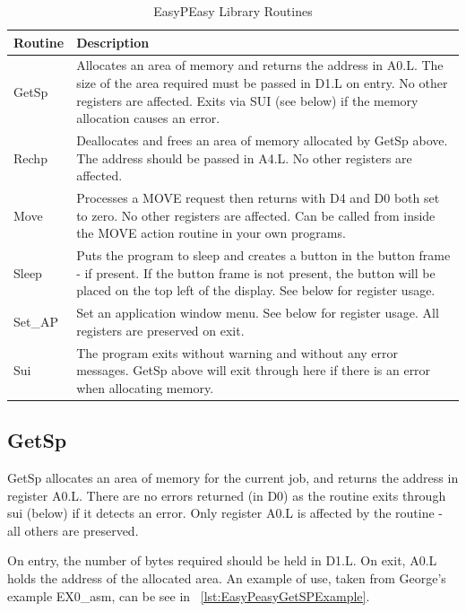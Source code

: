 \begin{table}[htbp]
\centering
\begin{tabular}{l p{}}
\toprule
\textbf{Routine} & \textbf{Description}  \\
\midrule
%
GetSp & Allocates an area of memory and returns the address in A0.L. The size of the area required must be passed in D1.L on entry. No other registers are affected. Exits via SUI (see below) if the memory allocation causes an error.\\
Rechp & Deallocates and frees an area of memory allocated by GetSp above. The address should be passed in A4.L. No other registers are affected.\\
Move & Processes a MOVE request then returns with D4 and D0 both set to zero. No other registers are affected. Can be called from inside the MOVE action routine in your own programs.\\
Sleep & Puts the program to sleep and creates a button in the button frame - if present. If the button frame is not present, the button will be placed on the top left of the display. See below for register usage.\\
Set\_AP & Set an application window menu. See below for register usage. All registers are preserved on exit.\\
Sui & The program exits without warning and without any error messages. GetSp above will exit through here if there is an error when allocating memory.\\
%
\bottomrule
\end{tabular}
\caption{EasyPEasy Library Routines}
\label{tab:EasyPEasyLibraryRoutines}
\end{table}

\subsection{GetSp}
\label{ch26-sub-getsp}%

GetSp allocates an area of memory for the current job, and returns the
            address in register A0.L. There are no errors returned (in D0) as the routine
            exits through sui (below) if it detects an error. Only register A0.L is
            affected by the routine -{} all others are preserved.

On entry, the number of bytes required should be held in D1.L. On exit,
            A0.L holds the address of the allocated area. An example of use, taken from
            George's example EX0\_asm, can be see in \lstlistingname~\ref{lst:EasyPeasyGetSPExample}.

